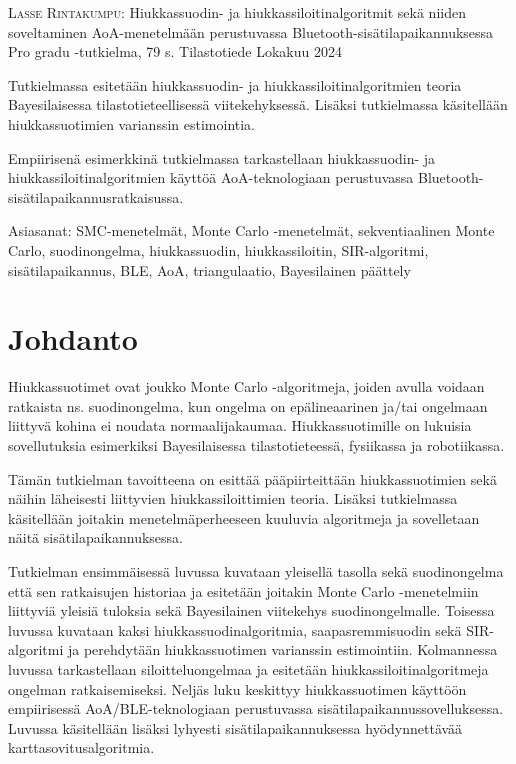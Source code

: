 \documentclass[
  12pt,
  a4paper, twoside]{book}
\newcommand{\tekija}{{Lasse Rintakumpu}}
\newcommand{\otsikko}{{Hiukkassuodin- ja hiukkassiloitinalgoritmit sekä niiden soveltaminen AoA-menetelmään perustuvassa Bluetooth-sisätilapaikannuksessa}}
\newcommand{\tutkielma}{{Pro gradu }}
\newcommand{\aika}{{Lokakuu 2024}}
\newcommand{\paaaine}{{Tilastotiede}}
\begin{document}
\noindent \textsc{\tekija}: \otsikko \newline
\tutkielma-tutkielma, 79 s. \newline
\paaaine \newline
\aika
\par\noindent{\rule{\textwidth}{.2mm}} \newline


\vspace{4mm}\noindent Tutkielmassa esitetään hiukkassuodin- ja hiukkassiloitinalgoritmien teoria Bayesilaisessa tilastotieteellisessä viitekehyksessä. Lisäksi tutkielmassa käsitellään hiukkassuotimien varianssin estimointia.

\vspace{4mm}\noindent Empiirisenä esimerkkinä tutkielmassa tarkastellaan hiukkassuodin- ja hiukkassiloitinalgoritmien käyttöä AoA-teknologiaan perustuvassa Bluetooth-sisätilapaikannusratkaisussa.

\vspace{4mm}\noindent Asiasanat: SMC-menetelmät, Monte Carlo -menetelmät, sekventiaalinen Monte Carlo, suodinongelma, hiukkassuodin, hiukkassiloitin, SIR-algoritmi, sisätilapaikannus, BLE, AoA, triangulaatio, Bayesilainen päättely

\cleardoublepage

\cleardoublepage

\pagestyle{plain} 

{
\hypersetup{linkcolor=blue}
\setcounter{tocdepth}{2}
\tableofcontents
}
\setlength\parindent{24pt}
\setlength\parskip{3pt}

\chapter{Johdanto}

Hiukkassuotimet ovat joukko Monte Carlo -algoritmeja, joiden avulla voidaan ratkaista ns. suodinongelma, kun ongelma on epälineaarinen ja/tai ongelmaan liittyvä kohina ei noudata normaalijakaumaa. Hiukkassuotimille on lukuisia sovellutuksia esimerkiksi Bayesilaisessa tilastotieteessä, fysiikassa ja robotiikassa.

Tämän tutkielman tavoitteena on esittää pääpiirteittään hiukkassuotimien sekä näihin läheisesti liittyvien hiukkassiloittimien teoria. Lisäksi tutkielmassa käsitellään joitakin menetelmäperheeseen kuuluvia algoritmeja ja sovelletaan näitä sisätilapaikannuksessa.

Tutkielman ensimmäisessä luvussa kuvataan yleisellä tasolla sekä suodinongelma että sen ratkaisujen historiaa ja esitetään joitakin Monte Carlo -menetelmiin liittyviä yleisiä tuloksia sekä Bayesilainen viitekehys suodinongelmalle. Toisessa luvussa kuvataan kaksi hiukkassuodinalgoritmia, saapasremmisuodin sekä SIR-algoritmi ja perehdytään hiukkassuotimen varianssin estimointiin. Kolmannessa luvussa tarkastellaan siloitteluongelmaa ja esitetään hiukkassiloitinalgoritmeja ongelman ratkaisemiseksi. Neljäs luku keskittyy hiukkassuotimen käyttöön empiirisessä AoA/BLE-teknologiaan perustuvassa sisätilapaikannussovelluksessa. Luvussa käsitellään lisäksi lyhyesti sisätilapaikannuksessa hyödynnettävää karttasovitusalgoritmia.
\end{document}
